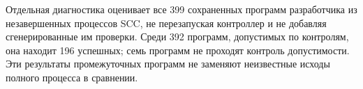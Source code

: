 Отдельная диагностика оценивает все 399 сохраненных программ разработчика из незавершенных процессов SCC, не перезапуская контроллер и не добавляя сгенерированные им проверки. Среди 392 программ, допустимых по контролям, она находит 196 успешных; семь программ не проходят контроль допустимости. Эти результаты промежуточных программ не заменяют неизвестные исходы полного процесса в сравнении.
